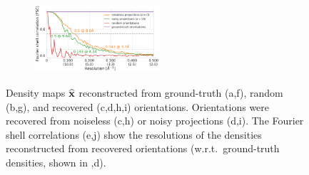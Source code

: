 \begin{figure}[t]
\begin{subfigure}[b]{0.30\linewidth}
        \centering
        \includegraphics[height=2.5cm]{figures/5a1a_quartercvg_uniformS2_noise0_FSC_apr_init_customFSC2.pdf}
        \caption{}
    \end{subfigure}
    \caption{%
        Density maps $\widehat{\mathbf{x}}$ reconstructed from ground-truth (a,f), random (b,g), and recovered (c,d,h,i) orientations.
        Orientations were recovered from noiseless (c,h) or noisy projections (d,i).
        The Fourier shell correlations (e,j) show the resolutions of the densities reconstructed from recovered orientations (w.r.t.\ ground-truth densities, shown in ,d).
    }\label{fig:reconstructions}
\end{figure}



